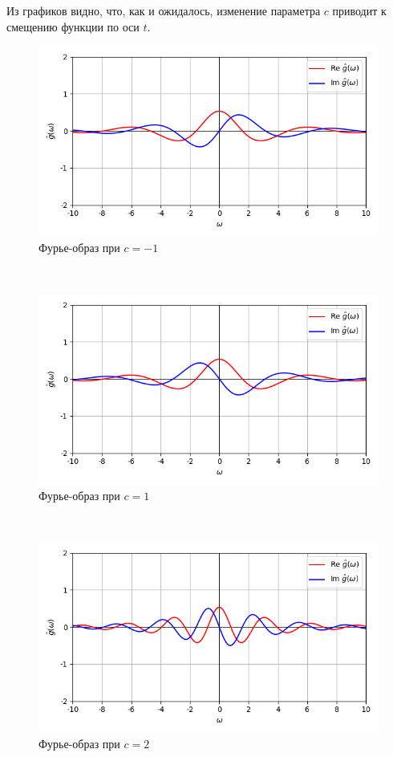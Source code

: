 \documentclass[a4paper]{article}
\begin{document}
Из графиков видно, что, как и ожидалось, изменение параметра $c$ приводит к смещению функции по оси $t$.

\begin{figure}[H]
        \centering \includegraphics[width=\textwidth]{complex/complex_fourier_2_3_-1.png}
        \caption{Фурье-образ при $c = -1$}
\end{figure}\noindent\
\begin{figure}[H]
        \centering \includegraphics[width=\textwidth]{complex/complex_fourier_2_3_1.png}
        \caption{Фурье-образ при $c = 1$}
\end{figure}\noindent\
\begin{figure}[H]
        \centering \includegraphics[width=\textwidth]{complex/complex_fourier_2_3_2.png}
        \caption{Фурье-образ при $c = 2$}
\end{figure}\noindent\
\end{document}
